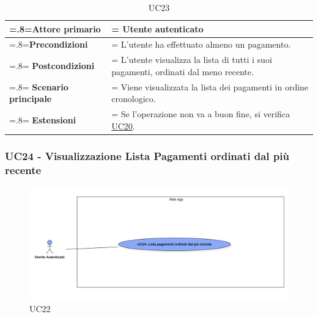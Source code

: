             \begin{table}[H]
                \centering
                \renewcommand{\arraystretch}{1.8}
                \renewcommand\tabularxcolumn[1]{m{#1}}
                \begin{tabularx}{0.9\textwidth} {
                    >{\hsize=.8\hsize\linewidth=\hsize}X
                    >{\hsize=1.2\hsize\linewidth=\hsize}X}
                    \hline
                    \textbf{Attore primario} & Utente autenticato \\
                    \hline
                    \textbf{Precondizioni} & L'utente ha effettuato almeno un pagamento. \\
                    \hline
                    \textbf{Postcondizioni} & L'utente visualizza la lista di tutti i suoi pagamenti, ordinati dal meno recente. \\
                    \hline
                    \textbf{Scenario principale} & Viene visualizzata la lista dei pagamenti in ordine cronologico. \\
                    \hline
                    \textbf{Estensioni} & Se l'operazione non va a buon fine, si verifica \hyperref[UC20]{UC20}. \\
                    \hline
                \end{tabularx}
                \caption{UC23}
            \end{table}

        \subsubsection{UC24 - Visualizzazione Lista Pagamenti ordinati dal più recente}
        \label{UC24}

        \begin{figure}[H]
            \centering
            \includegraphics[scale=0.4]{src/img/UC24.png}
            \caption{UC22}
        \end{figure}


